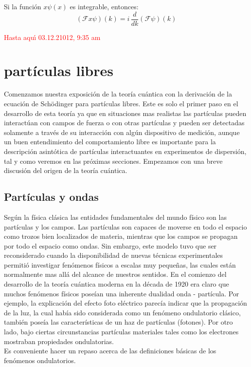 \documentclass[12pt]{book}
\numberwithin{equation}{chapter}
\def\F{\mathcal{F}}
\begin{document}
Si la funci\'on $x \psi (x)$ es integrable, entonces:
\begin{equation}
( \F x\psi )(k)= i \, \frac{d}{dk}(\F \psi)(k)
\end{equation}

\newpage
\textcolor{red}{Hasta aqu\'{\i} 03.12.21012, 9:35 am}
\chapter{part\'iculas libres}

Comenzamos nuestra exposici\'on de la teor\'ia cu\'antica con la derivaci\'on de la ecuaci\'on de Sch\"odinger para part\'iculas libres. Este es solo el primer paso en el desarrollo de esta teor\'ia ya que en situaciones mas realistas las part\'iculas pueden interact\'uan con campos de fuerza o con otras part\'iculas y pueden ser detectadas solamente a trav\'es de su interacci\'on con alg\'un dispositivo de medici\'on, aunque un buen entendimiento del comportamiento libre es importante para la descripci\'on asint\'otica de part\'iculas interactuantes en experimentos de dispersi\'on, tal y como veremos en las pr\'oximas secciones. Empezamos con una breve discusi\'on del origen de la teor\'ia cu\'antica.

\section{Part\'iculas y ondas}
Seg\'un la f\'isica cl\'asica las entidades fundamentales del mundo f\'isico son las part\'iculas y los campos. Las part\'iculas son capaces de moverse en todo el espacio como trozos bien localizados de materia, mientras que los campos se propagan por todo el espacio como ondas. Sin embargo, este modelo tuvo que ser reconsiderado cuando la disponibilidad de nuevas t\'ecnicas experimentales permiti\'o investigar fen\'omenos f\'isicos a escalas muy peque\~nas, las cuales est\'an normalmente mas all\'a del alcance de nuestros sentidos. En el comienzo del desarrollo de la teor\'ia cu\'antica moderna en la d\'ecada de 1920 era claro que muchos fen\'omenos f\'isicos pose\'ian una inherente dualidad onda - part\'icula. Por ejemplo, la explicaci\'on del efecto foto el\'ectrico parec\'ia indicar que la propagaci\'on de la luz, la cual hab\'ia sido considerada como un fen\'omeno ondulatorio cl\'asico, tambi\'en pose\'ia las caracter\'isticas de un haz de part\'iculas (fotones). Por otro lado, bajo ciertas circunstancias part\'iculas materiales tales como los electrones mostraban propiedades ondulatorias. \\
Es conveniente hacer un repaso acerca de las definiciones b\'asicas de los fen\'omenos ondulatorios.\\
\end{document}
